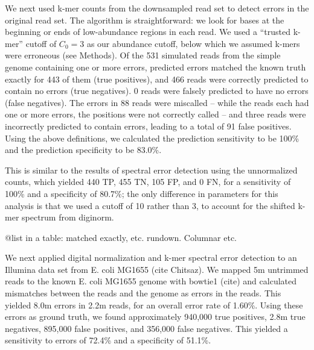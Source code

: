\documentclass{article}
\begin{document}

We next used k-mer counts from the downsampled read set to detect
errors in the original read set.  The algorithm is straightforward: we
look for bases at the beginning or ends of low-abundance regions in
each read. We used a ``trusted k-mer'' cutoff of $C_0 = 3$ as our
abundance cutoff, below which we assumed k-mers were erroneous (see
Methods).  Of the 531 simulated reads from the simple genome
containing one or more errors, predicted errors matched the known
truth exactly for 443 of them (true positives), and 466 reads were
correctly predicted to contain no errors (true negatives). 0 reads
were falsely predicted to have no errors (false negatives). The errors
in 88 reads were miscalled -- while the reads each had one or more
errors, the positions were not correctly called -- and three reads
were incorrectly predicted to contain errors, leading to a total of 91
false positives.  Using the above definitions, we calculated the
prediction sensitivity to be 100\% and the prediction specificity to
be 83.0\%.


This is similar to the results of spectral error detection using the
unnormalized counts, which yielded 440 TP, 455 TN, 105 FP, and 0 FN,
for a sensitivity of 100\% and a specificity of 80.7\%; the only
difference in parameters for this analysis is that we used a cutoff of
10 rather than 3, to account for the shifted k-mer spectrum from
diginorm.

@list in a table: matched exactly, etc. rundown.  Columnar etc.


We next applied digital normalization and k-mer spectral error
detection to an Illumina data set from E. coli MG1655 (cite Chitsaz).
We mapped 5m untrimmed reads to the known E. coli MG1655 genome with
bowtie1 (cite) and calculated mismatches between the reads and the
genome as errors in the reads.  This yielded 8.0m errors in 2.2m reads,
for an overall error rate of 1.60\%.  Using these errors as ground truth,
we found approximately 940,000 true positives, 2.8m true negatives,
895,000 false positives, and 356,000 false negatives.  This yielded
a sensitivity to errors of 72.4\% and a specificity of 51.1\%.
\end{document}
